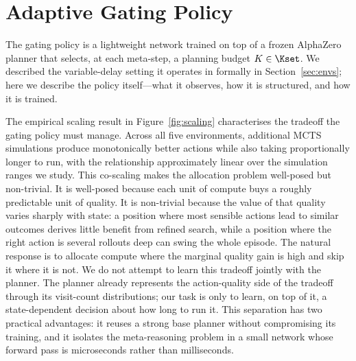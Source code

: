 %

\section{Adaptive Gating Policy}
\label{sec:method}

The gating policy is a lightweight network trained on top of a frozen
AlphaZero planner that selects, at each meta-step, a planning budget
$K \in \Kset$.
We described the variable-delay setting it operates in formally in
Section~\ref{sec:envs}; here we describe the policy itself---what it
observes, how it is structured, and how it is trained.

The empirical scaling result in Figure~\ref{fig:scaling} characterises
the tradeoff the gating policy must manage.
Across all five environments, additional MCTS simulations produce
monotonically better actions while also taking proportionally longer to
run, with the relationship approximately linear over the simulation
ranges we study.
This co-scaling makes the allocation problem well-posed but non-trivial.
It is well-posed because each unit of compute buys a roughly predictable
unit of quality.
It is non-trivial because the value of that quality varies sharply with
state: a position where most sensible actions lead to similar outcomes
derives little benefit from refined search, while a position where the
right action is several rollouts deep can swing the whole episode.
The natural response is to allocate compute where the marginal quality
gain is high and skip it where it is not.
We do not attempt to learn this tradeoff jointly with the planner.
The planner already represents the action-quality side of the tradeoff
through its visit-count distributions; our task is only to learn, on top
of it, a state-dependent decision about how long to run it.
This separation has two practical advantages: it reuses a strong base
planner without compromising its training, and it isolates the
meta-reasoning problem in a small network whose forward pass is
microseconds rather than milliseconds.

